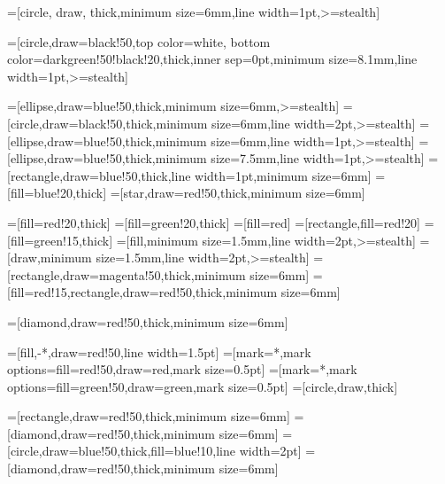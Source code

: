 =[circle, draw,%
thick,minimum size=6mm,line width=1pt,>=stealth]  %

=[circle,draw=black!50,top color=white, %
bottom color=darkgreen!50!black!20,thick,inner sep=0pt,minimum size=8.1mm,line width=1pt,>=stealth]  %

=[ellipse,draw=blue!50,thick,minimum size=6mm,>=stealth]  %
=[circle,draw=black!50,thick,minimum size=6mm,line width=2pt,>=stealth]  %
=[ellipse,draw=blue!50,thick,minimum size=6mm,line width=1pt,>=stealth]  %
=[ellipse,draw=blue!50,thick,minimum size=7.5mm,line width=1pt,>=stealth]  %
=[rectangle,draw=blue!50,thick,line width=1pt,minimum size=6mm]  %
=[fill=blue!20,thick]  %
=[star,draw=red!50,thick,minimum size=6mm]  %

=[fill=red!20,thick]  %
=[fill=green!20,thick]  %
=[fill=red]  %
=[rectangle,fill=red!20]  %
=[fill=green!15,thick]  %
=[fill,minimum size=1.5mm,line width=2pt,>=stealth]
=[draw,minimum size=1.5mm,line width=2pt,>=stealth]
=[rectangle,draw=magenta!50,thick,minimum size=6mm]  %
=[fill=red!15,rectangle,draw=red!50,thick,minimum size=6mm]  %

=[diamond,draw=red!50,thick,minimum size=6mm]  %

=[fill,-*,draw=red!50,line width=1.5pt]
=[mark=*,mark options={fill=red!50,draw=red},mark size=0.5pt]
=[mark=*,mark options={fill=green!50,draw=green},mark size=0.5pt]
=[circle,draw,thick]  %

=[rectangle,draw=red!50,thick,minimum size=6mm]  %
=[diamond,draw=red!50,thick,minimum size=6mm]  %
=[circle,draw=blue!50,thick,fill=blue!10,line width=2pt]  %
=[diamond,draw=red!50,thick,minimum size=6mm]  %

